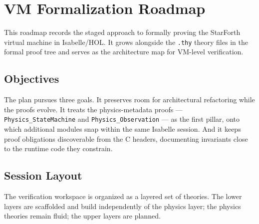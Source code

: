 
\section{VM Formalization Roadmap}

This roadmap records the staged approach to formally proving the StarForth virtual
machine in Isabelle/HOL. It grows alongside the \texttt{.thy} theory files in the
formal proof tree and serves as the architecture map for VM-level verification.

\subsection{Objectives}

The plan pursues three goals. It preserves room for architectural refactoring while
the proofs evolve. It treats the physics-metadata proofs ---
\texttt{Physics\_StateMachine} and \texttt{Physics\_Observation} --- as the first
pillar, onto which additional modules snap within the same Isabelle session. And it
keeps proof obligations discoverable from the C headers, documenting invariants close
to the runtime code they constrain.

\subsection{Session Layout}

The verification workspace is organized as a layered set of theories. The lower
layers are scaffolded and build independently of the physics layer; the physics
theories remain fluid; the upper layers are planned.


